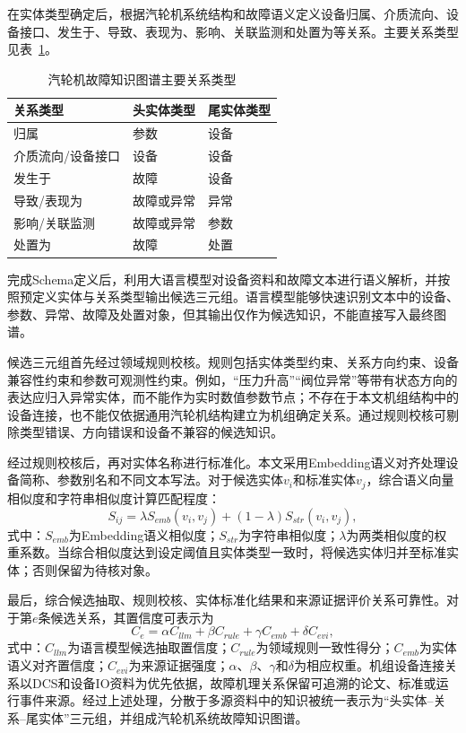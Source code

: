 在实体类型确定后，根据汽轮机系统结构和故障语义定义设备归属、介质流向、设备接口、发生于、导致、表现为、影响、关联监测和处置为等关系。主要关系类型见表~\ref{tab:kg_relation_types_v7}。

\begin{table}[htbp]
    \centering
    \caption{汽轮机故障知识图谱主要关系类型}
    \label{tab:kg_relation_types_v7}
    \begin{tabular}{lll}
        \toprule
        关系类型 & 头实体类型 & 尾实体类型 \\
        \midrule
        归属 & 参数 & 设备 \\
        介质流向/设备接口 & 设备 & 设备 \\
        发生于 & 故障 & 设备 \\
        导致/表现为 & 故障或异常 & 异常 \\
        影响/关联监测 & 故障或异常 & 参数 \\
        处置为 & 故障 & 处置 \\
        \bottomrule
    \end{tabular}
\end{table}

完成Schema定义后，利用大语言模型对设备资料和故障文本进行语义解析，并按照预定义实体与关系类型输出候选三元组。语言模型能够快速识别文本中的设备、参数、异常、故障及处置对象，但其输出仅作为候选知识，不能直接写入最终图谱。

候选三元组首先经过领域规则校核。规则包括实体类型约束、关系方向约束、设备兼容性约束和参数可观测性约束。例如，“压力升高”“阀位异常”等带有状态方向的表达应归入异常实体，而不能作为实时数值参数节点；不存在于本文机组结构中的设备连接，也不能仅依据通用汽轮机结构建立为机组确定关系。通过规则校核可剔除类型错误、方向错误和设备不兼容的候选知识。

经过规则校核后，再对实体名称进行标准化。本文采用Embedding语义对齐处理设备简称、参数别名和不同文本写法\cite{Reimers2019SentenceBERT}。对于候选实体$v_i$和标准实体$v_j$，综合语义向量相似度和字符串相似度计算匹配程度：
\begin{equation}
S_{ij}=\lambda S_{emb}(v_i,v_j)+(1-\lambda)S_{str}(v_i,v_j),
\end{equation}
式中：$S_{emb}$为Embedding语义相似度；$S_{str}$为字符串相似度；$\lambda$为两类相似度的权重系数。当综合相似度达到设定阈值且实体类型一致时，将候选实体归并至标准实体；否则保留为待核对象。

最后，综合候选抽取、规则校核、实体标准化结果和来源证据评价关系可靠性。对于第$e$条候选关系，其置信度可表示为
\begin{equation}
C_e=\alpha C_{llm}+\beta C_{rule}+\gamma C_{emb}+\delta C_{evi},
\end{equation}
式中：$C_{llm}$为语言模型候选抽取置信度；$C_{rule}$为领域规则一致性得分；$C_{emb}$为实体语义对齐置信度；$C_{evi}$为来源证据强度；$\alpha$、$\beta$、$\gamma$和$\delta$为相应权重。机组设备连接关系以DCS和设备IO资料为优先依据，故障机理关系保留可追溯的论文、标准或运行事件来源。经过上述处理，分散于多源资料中的知识被统一表示为“头实体--关系--尾实体”三元组，并组成汽轮机系统故障知识图谱。

